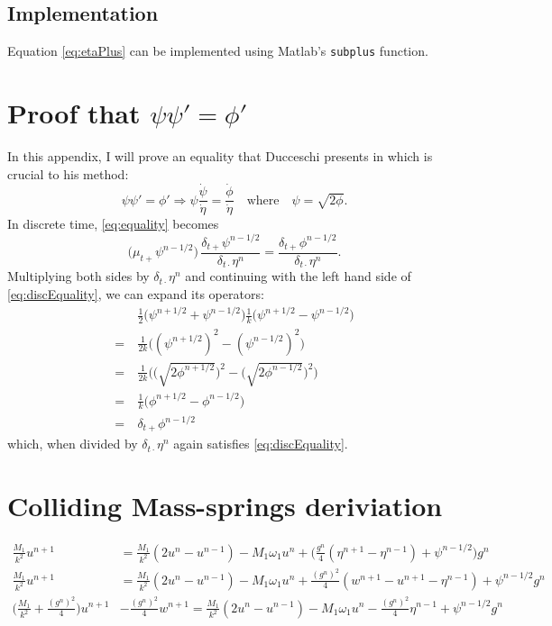 \documentclass{article}
\begin{document}
\subsection{Implementation}
Equation \eqref{eq:etaPlus} can be implemented using Matlab's \texttt{subplus} function.



\appendix
\section{Proof that $\psi\psi' = \phi'$}\label{app:phiPsiProof}
In this appendix, I will prove an equality that Ducceschi presents in \cite{Ducceschi2019} which is crucial to his method:
\begin{equation}\label{eq:equality}
    \psi\psi' = \phi' \Rightarrow \psi\frac{\dot{\psi}}{\dot{\eta}} = \frac{\dot{\phi}}{\dot\eta}\quad \text{where}\quad \psi = \sqrt{2\phi}.
\end{equation}
In discrete time, \eqref{eq:equality} becomes
\begin{equation}\label{eq:discEquality}
    \big(\mu_{t+}\psi^{n-1/2}\big)\,\frac{\delta_{t+}\psi^{n-1/2}}{\delta_{t\cdot}\eta^n} = \frac{\delta_{t+}\phi^{n-1/2}}{\delta_{t\cdot}\eta^n}. 
\end{equation}
Multiplying both sides by $\delta_{t\cdot} \eta^n$ and continuing with the left hand side of \eqref{eq:discEquality}, we can expand its operators:
\begin{equation}
    \begin{aligned}\nonumber
        &\frac{1}{2}\big(\psi^{n+1/2}+\psi^{n-1/2}\big)\frac{1}{k}\big(\psi^{n+1/2}-\psi^{n-1/2}\big) \\
        =\ &\frac{1}{2k}\Big((\psi^{n+1/2})^2 - (\psi^{n-1/2})^2\Big)\\
        =\ &\frac{1}{2k}\bigg(\Big(\sqrt{2\phi^{n+1/2}}\Big)^2 - \Big(\sqrt{2\phi^{n-1/2}}\Big)^2\bigg)\\
        =\ &\frac{1}{k}\Big(\phi^{n+1/2} - \phi^{n-1/2}\Big)\\
        =\ &\delta_{t+}\phi^{n-1/2}
    \end{aligned}
\end{equation}
which, when divided by $\delta_{t\cdot}\eta^n$ again satisfies \eqref{eq:discEquality}.

\section{Colliding Mass-springs deriviation}\label{app:massMassDeriv}
\begin{align}
    \frac{M_1}{k^2}u^{n+1} &= \frac{M_1}{k^2}(2u^n-u^{n-1})-M_1\omega_1u^n+\Big(\frac{g^n}{4}(\eta^{n+1}-\eta^{n-1})+\psi^{n-1/2}\Big)g^n\nonumber\\
    \frac{M_1}{k^2}u^{n+1} &= \frac{M_1}{k^2}(2u^n-u^{n-1})-M_1\omega_1u^n+\frac{(g^n)^2}{4}(w^{n+1}-u^{n+1}-\eta^{n-1})+\psi^{n-1/2}g^n\nonumber\\
    \bigg(\frac{M_1}{k^2}+\frac{(g^n)^2}{4}\bigg)u^{n+1} &- \frac{(g^n)^2}{4}w^{n+1} = \frac{M_1}{k^2}(2u^n-u^{n-1})-M_1\omega_1u^n-\frac{(g^n)^2}{4}\eta^{n-1}+\psi^{n-1/2}g^n
\end{align}
\end{document}
